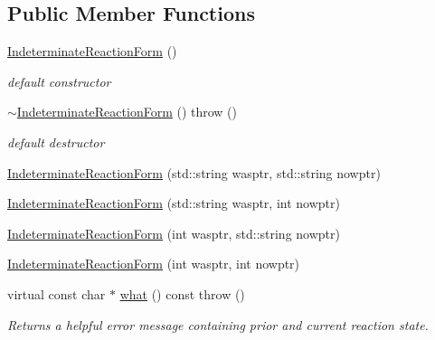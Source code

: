\subsection*{Public Member Functions}
\begin{DoxyCompactItemize}
\item 
\mbox{\label{classpyne_1_1rxname_1_1_indeterminate_reaction_form_a27a58bf85e1d384d5cf614ef72873e1b}} 
\hyperlink{classpyne_1_1rxname_1_1_indeterminate_reaction_form_a27a58bf85e1d384d5cf614ef72873e1b}{Indeterminate\+Reaction\+Form} ()
\begin{DoxyCompactList}\small\item\em default constructor \end{DoxyCompactList}\item 
\mbox{\label{classpyne_1_1rxname_1_1_indeterminate_reaction_form_a7df25775691de519d2ccdc9a25a4e5b2}} 
\hyperlink{classpyne_1_1rxname_1_1_indeterminate_reaction_form_a7df25775691de519d2ccdc9a25a4e5b2}{$\sim$\+Indeterminate\+Reaction\+Form} ()  throw ()
\begin{DoxyCompactList}\small\item\em default destructor \end{DoxyCompactList}\item 
\hyperlink{classpyne_1_1rxname_1_1_indeterminate_reaction_form_ad5a88cc1f318df127516265e9f2bdc87}{Indeterminate\+Reaction\+Form} (std\+::string wasptr, std\+::string nowptr)
\item 
\hyperlink{classpyne_1_1rxname_1_1_indeterminate_reaction_form_abcbbdd0a0a16e11b20eadffc1b7af7a4}{Indeterminate\+Reaction\+Form} (std\+::string wasptr, int nowptr)
\item 
\hyperlink{classpyne_1_1rxname_1_1_indeterminate_reaction_form_ae3b4b1af4980744bfe06bdd66f2ef696}{Indeterminate\+Reaction\+Form} (int wasptr, std\+::string nowptr)
\item 
\hyperlink{classpyne_1_1rxname_1_1_indeterminate_reaction_form_a8efd3b1144d39fc11e67f4411c3b5149}{Indeterminate\+Reaction\+Form} (int wasptr, int nowptr)
\item 
\mbox{\label{classpyne_1_1rxname_1_1_indeterminate_reaction_form_afc091cf7ee90dbee4334985b0374c251}} 
virtual const char $\ast$ \hyperlink{classpyne_1_1rxname_1_1_indeterminate_reaction_form_afc091cf7ee90dbee4334985b0374c251}{what} () const  throw ()
\begin{DoxyCompactList}\small\item\em Returns a helpful error message containing prior and current reaction state. \end{DoxyCompactList}\end{DoxyCompactItemize}


